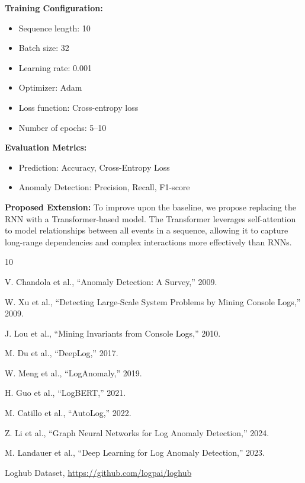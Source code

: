 \documentclass[12pt]{article}
\begin{document}
\textbf{Training Configuration:}
\begin{itemize}
    \item Sequence length: 10
    \item Batch size: 32
    \item Learning rate: 0.001
    \item Optimizer: Adam
    \item Loss function: Cross-entropy loss
    \item Number of epochs: 5--10
\end{itemize}

\textbf{Evaluation Metrics:}
\begin{itemize}
    \item Prediction: Accuracy, Cross-Entropy Loss
    \item Anomaly Detection: Precision, Recall, F1-score
\end{itemize}

\textbf{Proposed Extension:}
To improve upon the baseline, we propose replacing the RNN with a Transformer-based model. The Transformer leverages self-attention to model relationships between all events in a sequence, allowing it to capture long-range dependencies and complex interactions more effectively than RNNs.


\begin{thebibliography}{10}

V. Chandola et al.,
``Anomaly Detection: A Survey,'' 2009.

W. Xu et al.,
``Detecting Large-Scale System Problems by Mining Console Logs,'' 2009.

J. Lou et al.,
``Mining Invariants from Console Logs,'' 2010.

M. Du et al.,
``DeepLog,'' 2017.

W. Meng et al.,
``LogAnomaly,'' 2019.

H. Guo et al.,
``LogBERT,'' 2021.

M. Catillo et al.,
``AutoLog,'' 2022.

Z. Li et al.,
``Graph Neural Networks for Log Anomaly Detection,'' 2024.

M. Landauer et al.,
``Deep Learning for Log Anomaly Detection,'' 2023.

Loghub Dataset,
\url{https://github.com/logpai/loghub}

\end{thebibliography}
\end{document}
